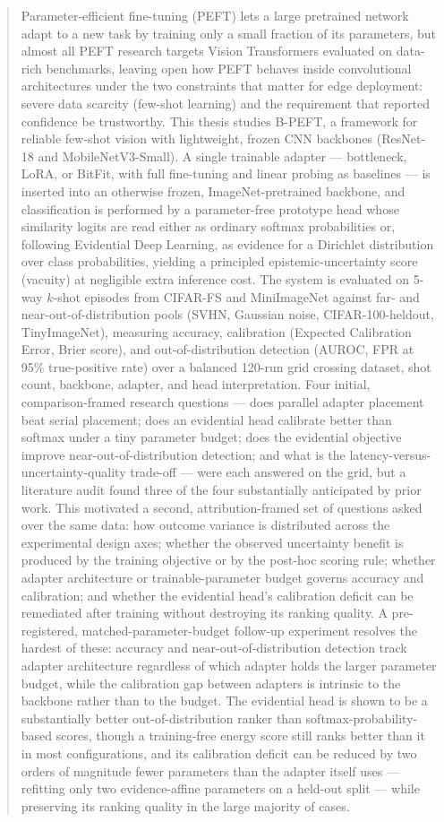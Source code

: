 \documentclass{iutbscthesis}
\begin{document}
\begin{abstract}
Parameter-efficient fine-tuning (PEFT) lets a large pretrained network adapt to a new task by training only a small fraction of its parameters, but almost all PEFT research targets Vision Transformers evaluated on data-rich benchmarks, leaving open how PEFT behaves inside convolutional architectures under the two constraints that matter for edge deployment: severe data scarcity (few-shot learning) and the requirement that reported confidence be trustworthy. This thesis studies B-PEFT, a framework for reliable few-shot vision with lightweight, frozen CNN backbones (ResNet-18 and MobileNetV3-Small). A single trainable adapter — bottleneck, LoRA, or BitFit, with full fine-tuning and linear probing as baselines — is inserted into an otherwise frozen, ImageNet-pretrained backbone, and classification is performed by a parameter-free prototype head whose similarity logits are read either as ordinary softmax probabilities or, following Evidential Deep Learning, as evidence for a Dirichlet distribution over class probabilities, yielding a principled epistemic-uncertainty score (vacuity) at negligible extra inference cost. The system is evaluated on 5-way $k$-shot episodes from CIFAR-FS and MiniImageNet against far- and near-out-of-distribution pools (SVHN, Gaussian noise, CIFAR-100-heldout, TinyImageNet), measuring accuracy, calibration (Expected Calibration Error, Brier score), and out-of-distribution detection (AUROC, FPR at 95\% true-positive rate) over a balanced 120-run grid crossing dataset, shot count, backbone, adapter, and head interpretation. Four initial, comparison-framed research questions — does parallel adapter placement beat serial placement; does an evidential head calibrate better than softmax under a tiny parameter budget; does the evidential objective improve near-out-of-distribution detection; and what is the latency-versus-uncertainty-quality trade-off — were each answered on the grid, but a literature audit found three of the four substantially anticipated by prior work. This motivated a second, attribution-framed set of questions asked over the same data: how outcome variance is distributed across the experimental design axes; whether the observed uncertainty benefit is produced by the training objective or by the post-hoc scoring rule; whether adapter architecture or trainable-parameter budget governs accuracy and calibration; and whether the evidential head's calibration deficit can be remediated after training without destroying its ranking quality. A pre-registered, matched-parameter-budget follow-up experiment resolves the hardest of these: accuracy and near-out-of-distribution detection track adapter architecture regardless of which adapter holds the larger parameter budget, while the calibration gap between adapters is intrinsic to the backbone rather than to the budget. The evidential head is shown to be a substantially better out-of-distribution ranker than softmax-probability-based scores, though a training-free energy score still ranks better than it in most configurations, and its calibration deficit can be reduced by two orders of magnitude fewer parameters than the adapter itself uses — refitting only two evidence-affine parameters on a held-out split — while preserving its ranking quality in the large majority of cases.

\end{abstract}
\end{document}
